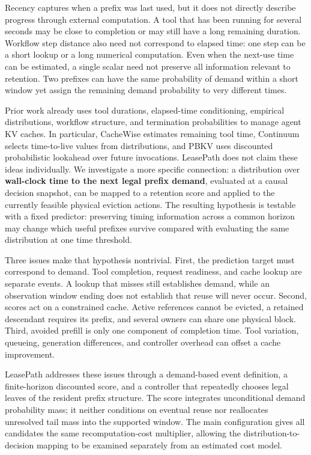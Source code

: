 \documentclass[sigconf, screen, review, balance=false]{acmart}
\begin{document}
Recency captures when a prefix was last used, but it does not directly
describe progress through external computation. A tool that has been
running for several seconds may be close to completion or may still have
a long remaining duration. Workflow step distance also need not
correspond to elapsed time: one step can be a short lookup or a long
numerical computation. Even when the next-use time can be estimated, a
single scalar need not preserve all information relevant to retention.
Two prefixes can have the same probability of demand within a short
window yet assign the remaining demand probability to very different
times.

Prior work already uses tool durations, elapsed-time conditioning,
empirical distributions, workflow structure, and termination
probabilities to manage agent KV caches. In particular, CacheWise
estimates remaining tool time, Continuum selects time-to-live values
from distributions, and PBKV uses discounted probabilistic lookahead
over future invocations. LeasePath does not claim these ideas
individually. We investigate a more specific connection: a distribution
over \textbf{wall-clock time to the next legal prefix demand}, evaluated
at a causal decision snapshot, can be mapped to a retention score and
applied to the currently feasible physical eviction actions. The
resulting hypothesis is testable with a fixed predictor: preserving
timing information across a common horizon may change which useful
prefixes survive compared with evaluating the same distribution at one
time threshold.

Three issues make that hypothesis nontrivial. First, the prediction
target must correspond to demand. Tool completion, request readiness,
and cache lookup are separate events. A lookup that misses still
establishes demand, while an observation window ending does not
establish that reuse will never occur. Second, scores act on a
constrained cache. Active references cannot be evicted, a retained
descendant requires its prefix, and several owners can share one
physical block. Third, avoided prefill is only one component of
completion time. Tool variation, queueing, generation differences, and
controller overhead can offset a cache improvement.

LeasePath addresses these issues through a demand-based event
definition, a finite-horizon discounted score, and a controller that
repeatedly chooses legal leaves of the resident prefix structure. The
score integrates unconditional demand probability mass; it neither
conditions on eventual reuse nor reallocates unresolved tail mass into
the supported window. The main configuration gives all candidates the
same recomputation-cost multiplier, allowing the
distribution-to-decision mapping to be examined separately from an
estimated cost model.
\end{document}
